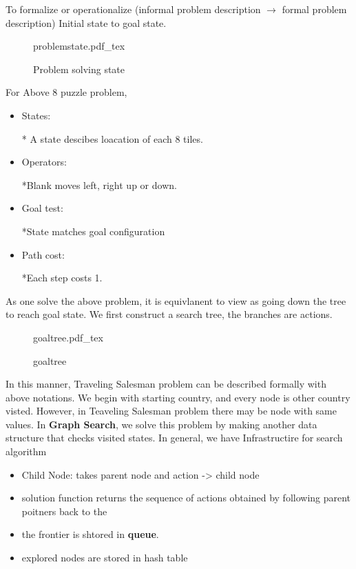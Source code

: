 \documentclass[9pt]{article}
\begin{document}
\maketitle
To formalize or operationalize (informal problem description $\rightarrow$ formal problem description)
Initial state to goal state.
\begin{figure}[H]
	\centering
	\def\svgwidth{\columnwidth}
	{problemstate.pdf_tex}
	\caption{Problem solving state}
	\label{fig:problemstate}
\end{figure}

For Above 8 puzzle problem,
\begin{itemize}
  \item States:

  * A state descibes loacation of each 8 tiles.
  \item Operators:

  *Blank moves left, right up or down.
  \item Goal test:

  *State matches goal configuration
  \item Path cost:

  *Each step costs 1.
\end{itemize}

As one solve the above problem, it is equivlanent to view as going down the tree to reach goal state.
We first construct a search tree, the branches are actions.


\begin{figure}[H]
	\centering
	\def\svgwidth{\columnwidth}
	{goaltree.pdf_tex}
	\caption{goaltree}
	\label{fig:goaltree}
\end{figure}


In this manner, Traveling Salesman problem can be described formally with above notations. We begin with starting country, and every node is other country visted.
However, in Teaveling Salesman problem there may be node with same values. In \textbf{Graph Search}, we solve this problem by making another data structure that checks visited states.
In general, we have
\large{Infrastructire for search algorithm}

\begin{itemize}
  \item Child Node: takes parent node and action -> child node
  \item solution function returns the sequence of actions obtained by following parent poitners back to the %
  \item the frontier is shtored in \textbf{queue}. %
  \item explored nodes are stored in hash table %
\end{itemize}
\end{document}
